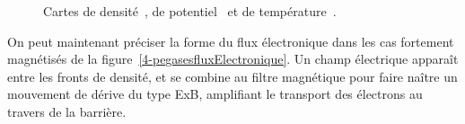 \begin{refsection}
	\begin{figure}[!htbp]
  \centering
    \caption{Cartes de densité~, de
    potentiel~ et de
    température~.}
    \label{4-PegasesCarteDensiteVarBiasWave}
\end{figure}

On peut maintenant préciser la forme du flux électronique 
dans les cas fortement magnétisés de la
figure~\ref{4-pegasesfluxElectronique}. Un champ électrique apparaît
entre les fronts de densité, et se combine au filtre
magnétique pour faire naître un mouvement de dérive du type ExB, amplifiant le
transport des électrons au travers de la barrière. 


\end{refsection}
